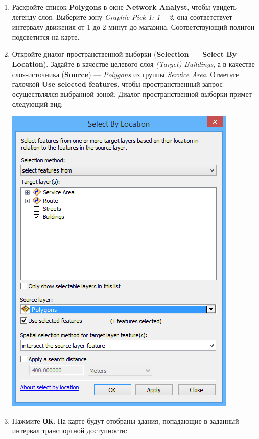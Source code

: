 \documentclass[]{book}
\theoremstyle{definition}
\theoremstyle{definition}
\theoremstyle{definition}
\theoremstyle{remark}
\begin{document}
\begin{enumerate}
\def\labelenumi{\arabic{enumi}.}
\item
  Раскройте список \textbf{Polygons} в окне \textbf{Network Analyst},
  чтобы увидеть легенду слоя. Выберите зону \emph{Graphic Pick 1: 1 --
  2}, она соответствует интервалу движения от 1 до 2 минут до магазина.
  Соответствующий полигон подсветится на карте.
\item
  Откройте диалог пространственной выборки (\textbf{Selection --- Select
  By Location}). Задайте в качестве целевого слоя \emph{(Target)
  Buildings}, а в качестве слоя-источника (\textbf{Source}) ---
  \emph{Polygons} из группы \emph{Service Area}. Отметьте галочкой
  \textbf{Use selected features}, чтобы пространственный запрос
  осуществлялся выбранной зоной. Диалог пространственной выборки примет
  следующий вид:

  \includegraphics{images/Ex12/image18.png}
\item
  Нажмите \textbf{ОК}. На карте будут отобраны здания, попадающие в
  заданный интервал транспортной доступности:


\end{enumerate}
\end{document}
